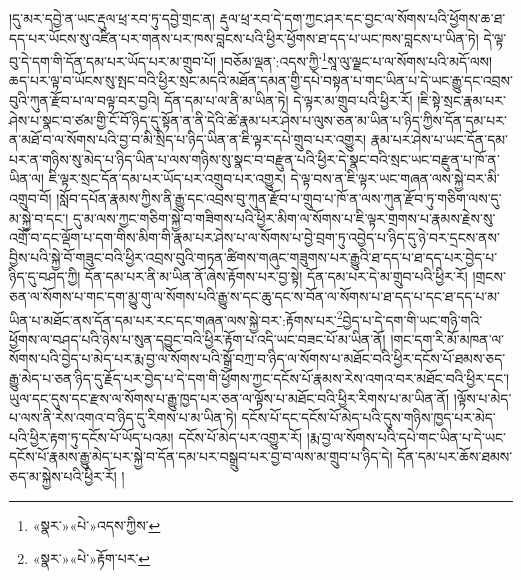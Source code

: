 །དུ་མར་དབྱེ་ན་ཡང་རྡུལ་ཕྲ་རབ་ཏུ་དབྱེ་གྲང་ན། རྡུལ་ཕྲ་རབ་དེ་དག་ཀྱང་ཤར་དང་བྱང་ལ་སོགས་པའི་ཕྱོགས་ཆ་ཐ་དད་པར་ཡོངས་སུ་འཛིན་པར་གནས་པར་ཁས་བླངས་པའི་ཕྱིར་ཕྱོགས་ཐ་དད་པ་ཡང་ཁས་བླངས་པ་ཡིན་ཏེ། དེ་ལྟ་བུ་དེ་དག་གི་དོན་དམ་པར་ཡོད་པར་མ་གྲུབ་པོ། །བཅོམ་ལྡན་:འདས་ཀྱི་\footnote{«སྣར་»«པེ་»འདས་ཀྱིས་}སཱ་ལུ་ལྗང་པ་ལ་སོགས་པའི་མདོ་ལས། ཆད་པར་ལྟ་བ་ཡོངས་སུ་སྤང་བའི་ཕྱིར་སྲང་མདའི་མཐོན་དམན་གྱི་དཔེ་བསྟན་པ་གང་ཡིན་པ་དེ་ཡང་རྒྱུ་དང་འབྲས་བུའི་ཀུན་རྫོབ་པ་ལ་བལྟ་བར་བྱའི། དོན་དམ་པ་ལ་ནི་མ་ཡིན་ཏེ། དེ་ལྟར་མ་གྲུབ་པའི་ཕྱིར་རོ། །ཇི་སྟེ་སྲང་རྣམ་པར་ཤེས་པ་སྣང་བ་ཙམ་གྱི་ངོ་བོ་ཉིད་དུ་སྟོན་ན་ནི་དེའི་ཚེ་རྣམ་པར་ཤེས་པ་ལུས་ཅན་མ་ཡིན་པ་ཉིད་ཀྱིས་དོན་དམ་པར་ན་མཐོ་བ་ལ་སོགས་པའི་བྱ་བ་མི་སྲིད་པ་ཉིད་ཡིན་ན་ཇི་ལྟར་དཔེ་གྲུབ་པར་འགྱུར། རྣམ་པར་ཤེས་པ་ཡང་དོན་དམ་པར་ན་གཉིས་སུ་མེད་པ་ཉིད་ཡིན་པ་ལས་གཉིས་སུ་སྣང་བ་བརྫུན་པའི་ཕྱིར་དེ་སྣང་བའི་སྲང་ཡང་བརྫུན་པ་ཁོ་ན་ཡིན་ལ། ཇི་ལྟར་སྲང་དོན་དམ་པར་ཡོད་པར་འགྲུབ་པར་འགྱུར། དེ་ལྟ་བས་ན་ཇི་ལྟར་ཡང་གཞན་ལས་སྐྱེ་བར་མི་འགྲུབ་བོ། །སློབ་དཔོན་རྣམས་ཀྱིས་ནི་རྒྱུ་དང་འབྲས་བུ་ཀུན་རྫོབ་པ་གྲུབ་པ་ཁོ་ན་ལས་ཀུན་རྫོབ་ཏུ་གཅིག་ལས་དུ་མ་སྐྱེ་བ་དང་། དུ་མ་ལས་ཀྱང་གཅིག་སྐྱེ་བ་གཟིགས་པའི་ཕྱིར་མིག་ལ་སོགས་པ་ཇི་ལྟར་གྲགས་པ་རྣམས་རྗེས་སུ་འགྲོ་བ་དང་ལྡོག་པ་དག་གིས་མིག་གི་རྣམ་པར་ཤེས་པ་ལ་སོགས་པ་བྱེ་བྲག་ཏུ་འབྱེད་པ་ཉིད་དུ་ཉེ་བར་དྲངས་ནས་བྱིས་པའི་སྐྱེ་བོ་གཟུང་བའི་ཕྱིར་འབྲས་བུའི་གཏན་ཚིགས་གཞུང་གཟུགས་པར་རྒྱུའི་ཐ་དད་པ་ཐ་དད་པར་བྱེད་པ་ཉིད་དུ་བཤད་ཀྱི། དོན་དམ་པར་ནི་མ་ཡིན་ནོ་ཞེས་རྟོགས་པར་བྱ་སྟེ། དོན་དམ་པར་དེ་མ་གྲུབ་པའི་ཕྱིར་རོ། །གྲངས་ཅན་ལ་སོགས་པ་གང་དག་མྱུ་གུ་ལ་སོགས་པའི་རྒྱུ་ས་དང་ཆུ་དང་ས་བོན་ལ་སོགས་པ་ཐ་དད་པ་དང་ཐ་དད་པ་མ་ཡིན་པ་མཐོང་ནས་དོན་དམ་པར་རང་དང་གཞན་ལས་སྐྱེ་བར་:རྟོགས་པར་\footnote{«སྣར་»«པེ་»རྟོག་པར་}བྱེད་པ་དེ་དག་གི་ཡང་གཉི་གའི་ཕྱོགས་ལ་བཤད་པའི་ཉེས་པ་སུན་དབྱུང་བའི་ཕྱིར་རྟོག་པ་འདི་ཡང་བཟང་པོ་མ་ཡིན་ནོ། །གང་དག་རི་མོ་མཁན་ལ་སོགས་པའི་བྱེད་པ་མེད་པར་རྨ་བྱ་ལ་སོགས་པའི་སྒྲོ་བཀྲ་བ་ཉིད་ལ་སོགས་པ་མཐོང་བའི་ཕྱིར་དངོས་པོ་ཐམས་ཅད་རྒྱུ་མེད་པ་ཅན་ཉིད་དུ་རྗོད་པར་བྱེད་པ་དེ་དག་གི་ཕྱོགས་ཀྱང་དངོས་པོ་རྣམས་རེས་འགའ་བར་མཐོང་བའི་ཕྱིར་དང་། ཡུལ་དང་དུས་དང་རྫས་ལ་སོགས་པ་རྒྱུ་ཁྱད་པར་ཅན་ལ་ལྟོས་པ་མཐོང་བའི་ཕྱིར་རིགས་པ་མ་ཡིན་ནོ། །ལྟོས་པ་མེད་པ་ལས་ནི་རེས་འགའ་བ་ཉིད་དུ་རིགས་པ་མ་ཡིན་ཏེ། དངོས་པོ་དང་དངོས་པོ་མེད་པའི་དུས་གཉིས་ཁྱད་པར་མེད་པའི་ཕྱིར་རྟག་ཏུ་དངོས་པོ་ཡོད་པའམ། དངོས་པོ་མེད་པར་འགྱུར་རོ། །རྨ་བྱ་ལ་སོགས་པའི་དཔེ་གང་ཡིན་པ་དེ་ཡང་དངོས་པོ་རྣམས་རྒྱུ་མེད་པར་སྐྱེ་བ་དོན་དམ་པར་བསྒྲུབ་པར་བྱ་བ་ལས་མ་གྲུབ་པ་ཉིད་དེ། དོན་དམ་པར་ཆོས་ཐམས་ཅད་མ་སྐྱེས་པའི་ཕྱིར་རོ། །

